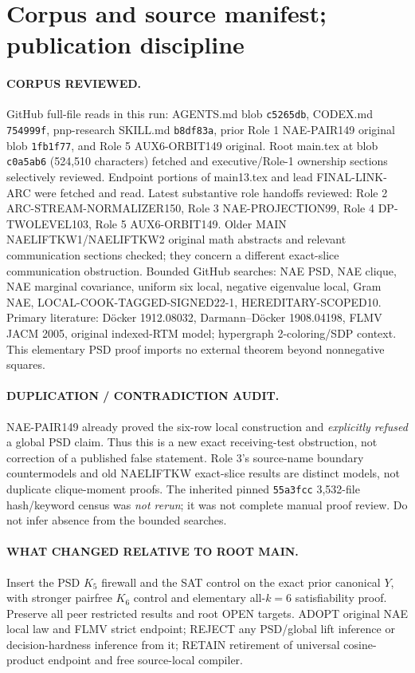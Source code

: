 \documentclass[11pt]{article}
\begin{document}
\section{Corpus and source manifest; publication discipline}
\paragraph{CORPUS REVIEWED.} GitHub full-file reads in this run: AGENTS.md blob \texttt{c5265db}, CODEX.md \texttt{754999f}, pnp-research SKILL.md \texttt{b8df83a}, prior Role 1 NAE-PAIR149 original blob \texttt{1fb1f77}, and Role 5 AUX6-ORBIT149 original. Root main.tex at blob \texttt{c0a5ab6} (524,510 characters) fetched and executive/Role-1 ownership sections selectively reviewed. Endpoint portions of main13.tex and lead FINAL-LINK-ARC were fetched and read. Latest substantive role handoffs reviewed: Role 2 ARC-STREAM-NORMALIZER150, Role 3 NAE-PROJECTION99, Role 4 DP-TWOLEVEL103, Role 5 AUX6-ORBIT149. Older MAIN NAELIFTKW1/NAELIFTKW2 original math abstracts and relevant communication sections checked; they concern a different exact-slice communication obstruction. Bounded GitHub searches: NAE PSD, NAE clique, NAE marginal covariance, uniform six local, negative eigenvalue local, Gram NAE, LOCAL-COOK-TAGGED-SIGNED22-1, HEREDITARY-SCOPED10. Primary literature: D\"ocker 1912.08032, Darmann--D\"ocker 1908.04198, FLMV JACM 2005, original indexed-RTM model; hypergraph 2-coloring/SDP context. This elementary PSD proof imports no external theorem beyond nonnegative squares.

\paragraph{DUPLICATION / CONTRADICTION AUDIT.} NAE-PAIR149 already proved the six-row local construction and \emph{explicitly refused} a global PSD claim. Thus this is a new exact receiving-test obstruction, not correction of a published false statement. Role 3's source-name boundary countermodels and old NAELIFTKW exact-slice results are distinct models, not duplicate clique-moment proofs. The inherited pinned \texttt{55a3fcc} 3,532-file hash/keyword census was \emph{not rerun}; it was not complete manual proof review. Do not infer absence from the bounded searches.

\paragraph{WHAT CHANGED RELATIVE TO ROOT MAIN.} Insert the PSD $K_5$ firewall and the SAT control on the exact prior canonical $Y$, with stronger pairfree $K_6$ control and elementary all-$k=6$ satisfiability proof. Preserve all peer restricted results and root OPEN targets. ADOPT original NAE local law and FLMV strict endpoint; REJECT any PSD/global lift inference or decision-hardness inference from it; RETAIN retirement of universal cosine-product endpoint and free source-local compiler.
\end{document}
